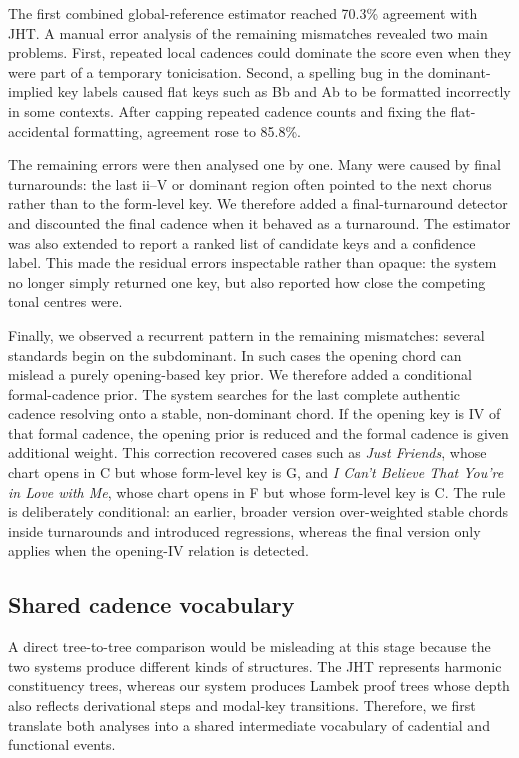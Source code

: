 The first combined global-reference estimator reached 70.3\% agreement with
JHT. A manual error analysis of the remaining mismatches revealed two main
problems. First, repeated local cadences could dominate the score even when
they were part of a temporary tonicisation. Second, a spelling bug in the
dominant-implied key labels caused flat keys such as Bb and Ab to be formatted
incorrectly in some contexts. After capping repeated cadence counts and fixing
the flat-accidental formatting, agreement rose to 85.8\%.

The remaining errors were then analysed one by one. Many were caused by final
turnarounds: the last ii--V or dominant region often pointed to the next
chorus rather than to the form-level key. We therefore added a final-turnaround
detector and discounted the final cadence when it behaved as a turnaround.
The estimator was also extended to report a ranked list of candidate keys and
a confidence label. This made the residual errors inspectable rather than
opaque: the system no longer simply returned one key, but also reported how
close the competing tonal centres were.

Finally, we observed a recurrent pattern in the remaining mismatches: several
standards begin on the subdominant. In such cases the opening chord can mislead
a purely opening-based key prior. We therefore added a conditional
formal-cadence prior. The system searches for the last complete authentic
cadence resolving onto a stable, non-dominant chord. If the opening key is IV
of that formal cadence, the opening prior is reduced and the formal cadence is
given additional weight. This correction recovered cases such as
\emph{Just Friends}, whose chart opens in C but whose form-level key is G, and
\emph{I Can't Believe That You're in Love with Me}, whose chart opens in F but
whose form-level key is C. The rule is deliberately conditional: an earlier,
broader version over-weighted stable chords inside turnarounds and introduced
regressions, whereas the final version only applies when the opening-IV
relation is detected.

\subsection{Shared cadence vocabulary}

A direct tree-to-tree comparison would be misleading at this stage because the
two systems produce different kinds of structures. The JHT represents harmonic
constituency trees, whereas our system produces Lambek proof trees whose depth
also reflects derivational steps and modal-key transitions. Therefore, we first
translate both analyses into a shared intermediate vocabulary of cadential and
functional events.

